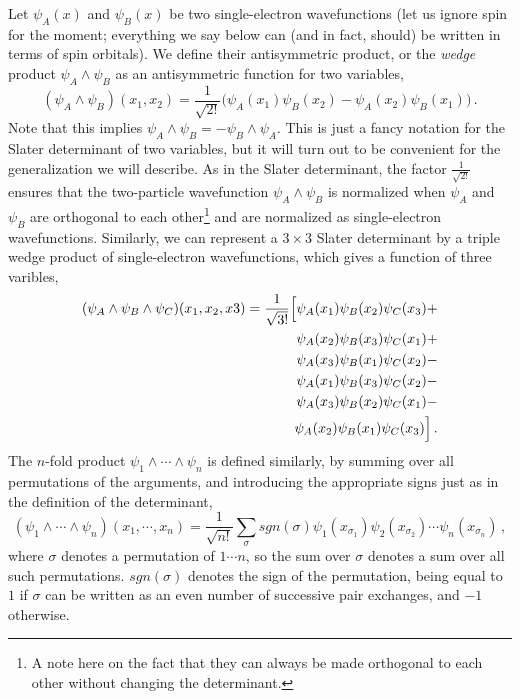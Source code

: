 \documentclass[11pt]{article}
\begin{document}
Let $\psi_A(x)$ and $\psi_B(x)$ be two single-electron wavefunctions
(let us ignore spin for the moment; everything we say below can (and
in fact, should) be written in terms of spin orbitals). We define
their antisymmetric product, or the {\it wedge} product $\psi_A
\wedge \psi_B$ as an antisymmetric function for two variables,
\begin{equation}
  (\psi_A \wedge \psi_B)(x_1, x_2) = \frac{1}{\sqrt{2!}} \big(\psi_A(x_1)
  \psi_B(x_2) - \psi_A(x_2)\psi_B(x_1)\big)\,.
\end{equation}
Note that this implies $\psi_A\wedge \psi_B=-\psi_B\wedge\psi_A$. 
This is just a fancy notation for the Slater determinant of two
variables, but it will turn out to be convenient for the
generalization we will describe. As in the Slater determinant, the
factor $\frac{1}{\sqrt{2!}}$ ensures that the two-particle wavefunction
$\psi_A\wedge \psi_B$ is normalized when $\psi_A$ and $\psi_B$ are
orthogonal to each other\footnote{A note here on the fact that they
  can always be made orthogonal to each other without changing the
  determinant.} 
and are normalized as single-electron 
wavefunctions. Similarly, we can represent a
$3\times 3$ Slater determinant by a triple wedge product of
single-electron wavefunctions, which gives a function of three varibles,
\begin{eqnarray}
  (\psi_A \wedge \psi_B \wedge \psi_C)(x_1,x_2,x3) =
  \frac{1}{\sqrt{3!}}\Big[
  \psi_A(x_1) \psi_B(x_2) \psi_C(x_3) + \cr
  \psi_A(x_2) \psi_B(x_3) \psi_C(x_1) + \cr
  \psi_A(x_3) \psi_B(x_1) \psi_C(x_2) - \cr
  \psi_A(x_1) \psi_B(x_3) \psi_C(x_2) - \cr
  \psi_A(x_3) \psi_B(x_2) \psi_C(x_1) - \cr
  \psi_A(x_2) \psi_B(x_1) \psi_C(x_3)\Big] \,.
\end{eqnarray}
The $n$-fold product $\psi_1\wedge\cdots\wedge\psi_n$ is defined similarly,
by summing over all permutations of the arguments, and introducing the
appropriate signs just as in the definition of the determinant,
\begin{equation}
  (\psi_1\wedge\cdots\wedge\psi_n)(x_1,\cdots,x_n) = \frac{1}{\sqrt{n!}} \sum_{\sigma} 
  sgn(\sigma)\psi_1(x_{\sigma_1}) \psi_2(x_{\sigma_2})\cdots \psi_n(x_{\sigma_n})\,,
\end{equation}
where $\sigma$ denotes a permutation of $1\cdots n$, so the sum over
$\sigma$ denotes a sum over all such permutations. $sgn(\sigma)$
denotes the sign of the permutation, being equal to $1$ if $\sigma$
can be written as an even number of successive pair exchanges, and
$-1$ otherwise.
\end{document}
